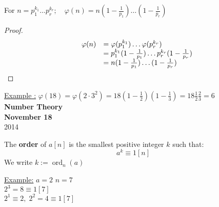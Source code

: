 \documentclass{report}
\DeclareMathOperator{\ord}{ord}
\begin{document}
\begin{thm}
				For $n=p_1^{k_1}\dots p_r^{k_r} ;\quad \varphi(n)=n(1-\frac{1}{p_1})\dots(1-\frac{1}{p_r})$
\end{thm}
\begin{proof}
					\[ 	\begin{array}{l c l}
							&\varphi(n)&=\varphi(p_1^{k_1})\dots\varphi(p_r^{k_r})\\
							&&=p_1^{k_1}(1-\frac{1}{p_1})\dots p_r^{k_r}(1-\frac{1}{p_r})\\
							&&=n(1-\frac{1}{p_1})\dots (1-\frac{1}{p_r})\\
							\end{array}
					\]
\end{proof}
\underline{Example :} $\varphi(18)=\varphi(2 \cdot 3^2)=18(1-\frac{1}{2})(1-\frac{1}{3}) = 18 \frac{1}{2} \frac{2}{3}=6$\\
\newpage
{\centering
\Large
\textbf{Number Theory}\\
\normalsize
\textbf{November 18}\\
2014\\
}
\vspace{10mm}
\begin{defi} The \textbf{order} of $a[n]$ is the smallest positive integer $k$ such that:
																\[ a^k \equiv 1 [n] \]
						We write $k:= \ord_n(a)$
\end{defi}
\underline{Example:} $a=2$ $n=7$\\
	$2^3=8 \equiv 1 [7]$\\
	$2^1 \equiv 2, \; 2^2=4\equiv 1 [7]$\\
\end{document}
